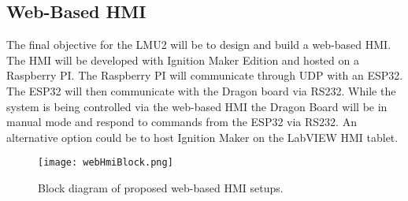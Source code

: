 \subsection{Web-Based HMI}
    The final objective for the LMU2 will be to design and build a web-based HMI. The HMI will be developed with Ignition Maker Edition and hosted on a Raspberry PI. The Raspberry PI will communicate through UDP with an ESP32. The ESP32 will then communicate with the Dragon board via RS232. While the system is being controlled via the web-based HMI the Dragon Board will be in manual mode and respond to commands from the ESP32 via RS232. An alternative option could be to host Ignition Maker on the LabVIEW HMI tablet.
    \\ \begin{figure}[ht]
        \centering
        \texttt{[image: webHmiBlock.png]}
        \caption{Block diagram of proposed web-based HMI setups.}
        \label{fig:webHmiBlock}
    \end{figure}
